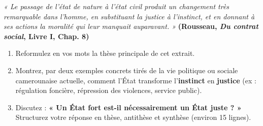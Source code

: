 \documentclass[11pt]{article}
\begin{document}
\begin{exercice}
\textit{« Le passage de l'état de nature à l'état civil produit un changement très remarquable dans l'homme, en substituant la justice à l'instinct, et en donnant à ses actions la moralité qui leur manquait auparavant. »} \textbf{(Rousseau, \textit{Du contrat social}, Livre I, Chap. 8)}

\begin{enumerate}
    \item Reformulez en vos mots la thèse principale de cet extrait.
    \item Montrez, par deux exemples concrets tirés de la vie politique ou sociale camerounaise actuelle, comment l'État transforme l'\textbf{instinct} en \textbf{justice} (ex : régulation foncière, répression des violences, service public).
    \item Discutez : \textbf{« Un État fort est-il nécessairement un État juste ? »} Structurez votre réponse en thèse, antithèse et synthèse (environ 15 lignes).
\end{enumerate}
\end{exercice}
\end{document}
